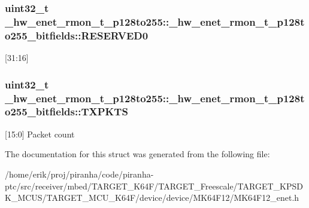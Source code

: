 \subsubsection[{\texorpdfstring{R\+E\+S\+E\+R\+V\+E\+D0}{RESERVED0}}]{\setlength{\rightskip}{0pt plus 5cm}uint32\+\_\+t \+\_\+hw\+\_\+enet\+\_\+rmon\+\_\+t\+\_\+p128to255\+::\+\_\+hw\+\_\+enet\+\_\+rmon\+\_\+t\+\_\+p128to255\+\_\+bitfields\+::\+R\+E\+S\+E\+R\+V\+E\+D0}\hypertarget{struct__hw__enet__rmon__t__p128to255_1_1__hw__enet__rmon__t__p128to255__bitfields_a7ab1d072b0212f05425c622dc880b225}{}\label{struct__hw__enet__rmon__t__p128to255_1_1__hw__enet__rmon__t__p128to255__bitfields_a7ab1d072b0212f05425c622dc880b225}
\mbox{[}31\+:16\mbox{]} 
\subsubsection[{\texorpdfstring{T\+X\+P\+K\+TS}{TXPKTS}}]{\setlength{\rightskip}{0pt plus 5cm}uint32\+\_\+t \+\_\+hw\+\_\+enet\+\_\+rmon\+\_\+t\+\_\+p128to255\+::\+\_\+hw\+\_\+enet\+\_\+rmon\+\_\+t\+\_\+p128to255\+\_\+bitfields\+::\+T\+X\+P\+K\+TS}\hypertarget{struct__hw__enet__rmon__t__p128to255_1_1__hw__enet__rmon__t__p128to255__bitfields_af7bbf9714368d81d1fcd754d5cf4918a}{}\label{struct__hw__enet__rmon__t__p128to255_1_1__hw__enet__rmon__t__p128to255__bitfields_af7bbf9714368d81d1fcd754d5cf4918a}
\mbox{[}15\+:0\mbox{]} Packet count 

The documentation for this struct was generated from the following file\+:\begin{DoxyCompactItemize}
\item 
/home/erik/proj/piranha/code/piranha-\/ptc/src/receiver/mbed/\+T\+A\+R\+G\+E\+T\+\_\+\+K64\+F/\+T\+A\+R\+G\+E\+T\+\_\+\+Freescale/\+T\+A\+R\+G\+E\+T\+\_\+\+K\+P\+S\+D\+K\+\_\+\+M\+C\+U\+S/\+T\+A\+R\+G\+E\+T\+\_\+\+M\+C\+U\+\_\+\+K64\+F/device/device/\+M\+K64\+F12/M\+K64\+F12\+\_\+enet.\+h\end{DoxyCompactItemize}
